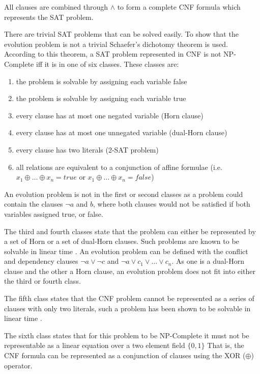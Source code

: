 All clauses are combined through $\wedge$ to form a complete CNF formula which represents the SAT problem.

There are trivial SAT problems that can be solved easily.
To show that the evolution problem is not a trivial Schaefer's dichotomy theorem \cite{Schaefer1978} is used.
According to this theorem, a SAT problem represented in CNF is not NP-Complete iff it is in one of six classes.
These classes are:
\begin{enumerate}
  \item the problem is solvable by assigning each variable false
  \item the problem is solvable by assigning each variable true
  \item every clause has at most one negated variable (Horn clause)
  \item every clause has at most one unnegated variable (dual-Horn clause)
  \item every clause has two literals (2-SAT problem)
  \item all relations are equivalent to a conjunction of affine formulae (i.e. $x_1 \oplus \ldots \oplus x_n = true$ or $x_1 \oplus \ldots \oplus x_n = false$)
\end{enumerate} 

An evolution problem is not in the first or second classes as a problem could contain the clauses $\neg a$ and $b$, 
where both clauses would not be satisfied if both variables assigned true, or false. 

The third and fourth classes state that the problem can either be represented by a set of Horn or a set of dual-Horn clauses.
Such problems are known to be solvable in linear time \cite{dowling1984linear}.
An evolution problem can be defined with the conflict and dependency clauses $\neg a \vee \neg c$ and $\neg a \vee c_1 \vee \ldots \vee c_n$. 
As one is a dual-Horn clause and the other a Horn clause, an evolution problem does not fit into either the third or fourth class.

The fifth class states that the CNF problem cannot be represented as a series of clauses with only two literals,
such a problem has been shown to be solvable in linear time \citep{aspvall1979linear}.

The sixth class states that for this problem to be NP-Complete it must not be representable as a linear equation over a two element field $\{0,1\}$
That is, the CNF formula can be represented as a conjunction of clauses using the XOR ($\oplus$) operator.
 
